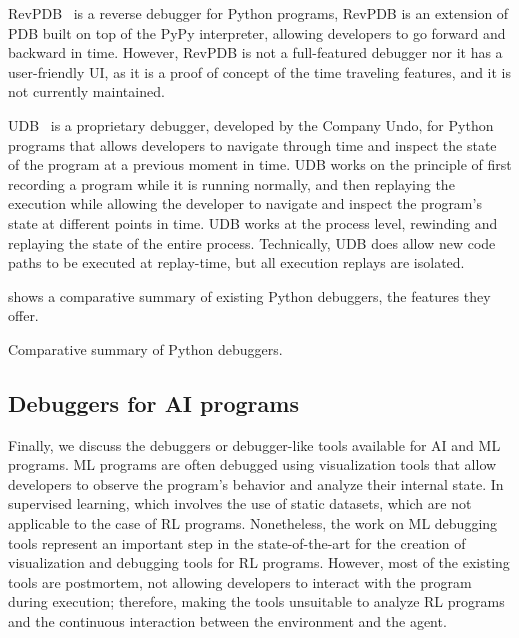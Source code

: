 \ac{RevPDB}~\cite{revdeb} is a reverse debugger for Python programs, RevPDB is an extension of 
\ac{PDB} built on top of the PyPy interpreter, allowing developers to go forward and backward in time. 
However, RevPDB is not a full-featured debugger nor it has a user-friendly UI, as it is a proof of 
concept of the time traveling features, and it is not currently maintained.


\ac{UDB}~\cite{udb} is a proprietary debugger, developed by the Company Undo, for Python 
programs that allows developers to navigate through time and inspect the state of the program at a 
previous moment in time. \ac{UDB} works on the principle of first recording 
a program while it is running normally, and then replaying the execution while allowing the 
developer to navigate and inspect the program's state at different points in time. \ac{UDB} works at 
the process level, rewinding and replaying the state of the entire process. Technically, 
\ac{UDB} does allow new code paths to be executed at replay-time, but all execution replays are 
isolated.

 shows a comparative summary of existing Python debuggers, the 
features they offer. 

\begin{table}[hptb]
  \centering
  
  \caption{Comparative summary of  Python debuggers.}
  \label{tab:python-debuggers}
\end{table}


\subsection{Debuggers for \ac{AI} programs}
\label{sec:ai}

Finally, we discuss the debuggers or debugger-like tools available for \ac{AI} and \ac{ML} programs. 
\ac{ML} programs are often debugged using visualization tools that allow developers to observe the 
program's behavior and analyze their internal state. In supervised learning, which involves the use of  
static datasets, which are not applicable to the case of \ac{RL} programs. Nonetheless, the work on 
\ac{ML} debugging tools represent an important step in the state-of-the-art for the creation of 
visualization and debugging tools for \ac{RL} programs.
However, most of the existing tools are postmortem, not allowing developers to interact with the 
program during execution; therefore, making the tools unsuitable to analyze \ac{RL} programs and 
the continuous interaction between the environment and the agent.

